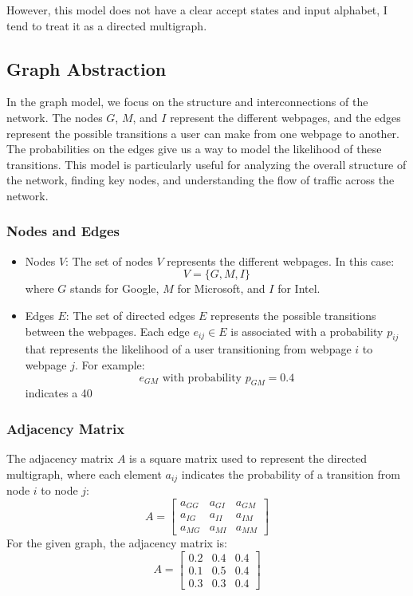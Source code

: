 \documentclass[12pt,a4paper]{article}
\begin{document}
However, this model does not have a clear accept states and input alphabet, I tend to treat it as a directed multigraph.


\subsection*{Graph Abstraction}
In the graph model, we focus on the structure and interconnections of the network. The nodes \(G\), \(M\), and \(I\) represent the different webpages, and the edges represent the possible transitions a user can make from one webpage to another. The probabilities on the edges give us a way to model the likelihood of these transitions. This model is particularly useful for analyzing the overall structure of the network, finding key nodes, and understanding the flow of traffic across the network.


\subsubsection*{Nodes and Edges}
\begin{itemize}
    \item Nodes \(V\): The set of nodes \(V\) represents the different webpages. In this case:
    \[
    V = \{G, M, I\}
    \]
    where \(G\) stands for Google, \(M\) for Microsoft, and \(I\) for Intel.

    \item Edges \(E\): The set of directed edges \(E\) represents the possible transitions between the webpages. Each edge \(e_{ij} \in E\) is associated with a probability \(p_{ij}\) that represents the likelihood of a user transitioning from webpage \(i\) to webpage \(j\). For example:
    \[
    e_{GM} \text{ with probability } p_{GM} = 0.4
    \]
    indicates a 40%
\end{itemize}

\subsubsection*{Adjacency Matrix}
The adjacency matrix \(A\) is a square matrix used to represent the directed multigraph, where each element \(a_{ij}\) indicates the probability of a transition from node \(i\) to node \(j\):
\[
A = 
\begin{bmatrix}
a_{GG} & a_{GI} & a_{GM} \\
a_{IG} & a_{II} & a_{IM} \\
a_{MG} & a_{MI} & a_{MM}
\end{bmatrix}
\]
For the given graph, the adjacency matrix is:
\begin{equation}\label{W4adjmat}
A = \begin{bmatrix}
0.2 & 0.4 & 0.4 \\
0.1 & 0.5 & 0.4 \\
0.3 & 0.3 & 0.4
\end{bmatrix}
\end{equation}
\end{document}
